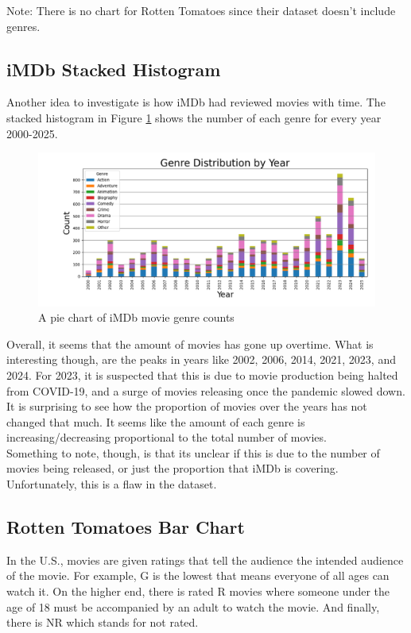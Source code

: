 \documentclass[12pt]{article}
\begin{document}
\noindent Note: There is no chart for Rotten Tomatoes since their dataset doesn't include genres.

\newpage

\subsection{iMDb Stacked Histogram}
Another idea to investigate is how iMDb had reviewed movies with time. The stacked histogram in Figure \ref{Figure 9} shows the number of each genre for every year 2000-2025.

\begin{figure}[h]
\begin{center}
      \includegraphics[width=6.5in]{figure9.png}
      \caption{A pie chart of iMDb movie genre counts}
      \label{Figure 9}
\end{center}
\end{figure}

\noindent Overall, it seems that the amount of movies has gone up overtime. What is interesting though, are the peaks in years like 2002, 2006, 2014, 2021, 2023, and 2024. For 2023, it is suspected that this is due to movie production being halted from COVID-19, and a surge of movies releasing once the pandemic slowed down. \\

\noindent It is surprising to see how the proportion of movies over the years has not changed that much. It seems like the amount of each genre is increasing/decreasing proportional to the total number of movies. \\

\noindent Something to note, though, is that its unclear if this is due to the number of movies being released, or just the proportion that iMDb is covering. Unfortunately, this is a flaw in the dataset.

\newpage

\subsection{Rotten Tomatoes Bar Chart}
In the U.S., movies are given ratings that tell the audience the intended audience of the movie. For example, G is the lowest that means everyone of all ages can watch it. On the higher end, there is rated R movies where someone under the age of 18 must be accompanied by an adult to watch the movie. And finally, there is NR which stands for not rated. \\
\end{document}

